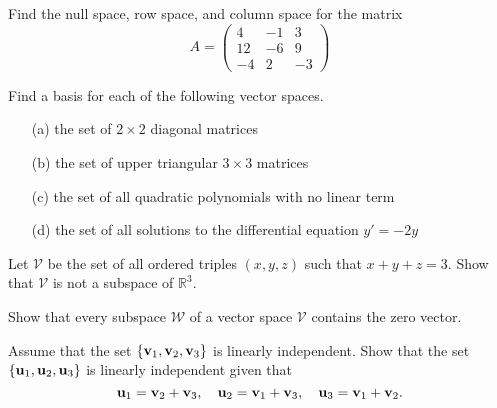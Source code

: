 \begin{problem}
    Find the null space, row space, and column space for the matrix
    \[ A = \begin{pmatrix} 4 & -1 & 3 \\ 12 & -6 & 9 \\ -4 & 2 & -3 \end{pmatrix} \]
\end{problem}


\begin{problem}
    Find a basis for each of the following vector spaces.
    \begin{enumerate}
        \item[(a)] the set of $2 \times 2$ diagonal matrices
        \item[(b)] the set of upper triangular $3 \times 3$ matrices
        \item[(c)] the set of all quadratic polynomials with no linear term
        \item[(d)] the set of all solutions to the differential equation $y' = -2y$
    \end{enumerate}
\end{problem}



\begin{problem}
    Let $\mathcal{V}$ be the set of all ordered triples $(x,y,z)$ such that $x+y+z=3$.
    Show that $\mathcal{V}$ is not a subspace of $\mathbb{R}^3$.
\end{problem}

\begin{problem}
    Show that every subspace $\mathcal{W}$ of a vector space $\mathcal{V}$ contains the
    zero vector.
\end{problem}

\begin{problem}
    Assume that the set $\{ {\bf v}_1, {\bf v}_2, {\bf v}_3 \}$ is linearly independent.  Show that
    the set $\{ {\bf u}_1, {\bf u}_2, {\bf u}_3\}$ is linearly independent given that
    \[ {\bf u}_1 = {\bf v}_2 + {\bf v}_3, \quad {\bf u}_2 = {\bf v}_1 + {\bf v}_3, \quad {\bf u}_3 = {\bf v}_1 + {\bf v}_2. \]
\end{problem}

